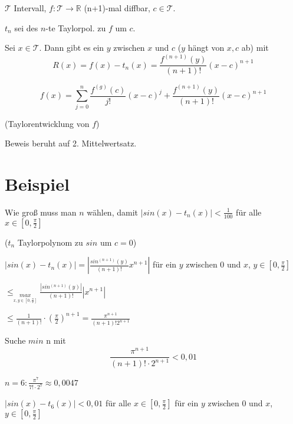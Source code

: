 \documentclass[a4paper, openany]{book}
\begin{document}
        $\mathcal{T}$ Intervall, $f: \mathcal{T} \rightarrow \mathbb{R}$ (n+1)-mal diffbar, $c \in \mathcal{T}$.

        \par \medskip

        $t_n$ sei des $n$-te Taylorpol. zu $f$ um $c$. 

        \par \medskip

        Sei $x \in \mathcal{T}$. Dann gibt es ein $y$ zwischen $x$ und $c$ ($y$ hängt von $x,c$ ab) mit \[ R(x) = f(x) - t_n(x) = \frac{f^{(n+1)}(y)}{(n+1)!} (x-c)^{n+1} \]

        \[ f(x) = \sum_{j=0}^n \frac{f^{(g)}(c)}{j!}(x-c)^j + \frac{f^{(n+1)}(y)}{(n+1)!}(x-c)^{n+1} \]

        (Taylorentwicklung von $f$)


        \par \medskip

        Beweis beruht auf 2. Mittelwertsatz.

        \section{Beispiel}

        Wie groß muss man $n$ wählen, damit $|sin(x) - t_n(x)| < \frac{1}{100}$ für alle $x \in [0, \frac{\pi}{2}]$

        ($t_n$ Taylorpolynom zu $sin$ um $c = 0$)

        \par \medskip

        $|sin(x) - t_n(x)| = | \frac{sin^{(n+1)} (y)}{(n+1)!} x^{n+1}|$ für ein $y$ zwischen 0 und $x$, $y \in [0, \frac{\pi}{2}]$

        $\le _{\underset{x,y \in [0, \frac{\pi}{2}]}{max}} \frac{|sin^{(n+1)}(y)|}{(n+1)!} |x^{n+1}|$

        $\le \frac{1}{(n+1)!} \cdot (\frac{\pi}{2})^{n+1} = \frac{\pi^{n+1}}{(n+1)! 2^{n+1}}$

        \par \medskip

        Suche $min$ n mit \[ \frac{\pi^{n+1}}{(n+1)! \cdot 2^{n+1}} < 0,01 \]

        $n = 6: \frac{\pi^7}{7! \cdot 2^7} \approx 0,0047$

        \par \medskip

        $|sin(x)-t_6(x)| < 0,01$ für alle $x \in [0, \frac{\pi}{2}]$ für ein $y$ zwischen 0 und $x$, $y \in [0, \frac{\pi}{2}]$

        

        
\end{document}
